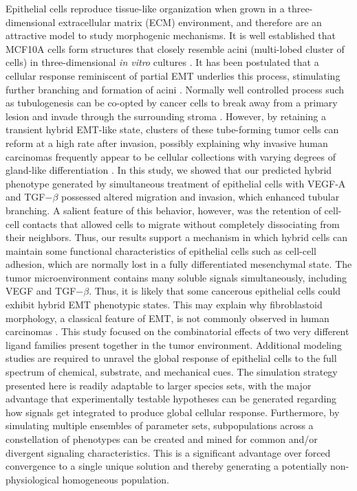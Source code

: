 \documentclass[11pt,letterpaper]{article}
\begin{document}
Epithelial cells reproduce tissue-like organization when grown in a three-dimensional extracellular matrix (ECM) environment, and therefore are an attractive model to study morphogenic mechanisms.
It is well established that MCF10A cells form structures that closely resemble acini (multi-lobed cluster of cells) in three-dimensional \emph{in vitro} cultures \cite{Debnath2003}.
It has been postulated that a cellular response reminiscent of partial EMT underlies this process, stimulating further branching and formation of acini \cite{Pearson:2007qq}.
Normally well controlled process such as tubulogenesis can be co-opted by cancer cells to break away from a primary lesion and invade through the surrounding stroma \cite{OBrien2004}.
However, by retaining a transient hybrid EMT-like state, clusters of these tube-forming tumor cells can reform at a high rate after invasion, possibly explaining why invasive human carcinomas frequently appear to be cellular collections with varying degrees of gland-like differentiation \cite{Debnath:2005qc}.
In this study, we showed that our predicted hybrid phenotype generated by simultaneous treatment of epithelial cells with VEGF-A and TGF$-\beta$ possessed altered migration and invasion, which enhanced tubular branching.
A salient feature of this behavior, however, was the retention of cell-cell contacts that allowed cells to migrate without completely dissociating from their neighbors.
Thus, our results support a mechanism in which hybrid cells can maintain some functional characteristics of epithelial cells such as cell-cell adhesion, which are normally lost in a fully differentiated mesenchymal state. The tumor microenvironment contains many soluble signals simultaneously, including VEGF and TGF$-\beta$.
Thus, it is likely that some cancerous epithelial cells could exhibit hybrid EMT phenotypic states.
This may explain why fibroblastoid morphology, a classical feature of EMT, is not commonly observed in human carcinomas \cite{Debnath:2005qc}.
This study focused on the combinatorial effects of two very different ligand families present together in the tumor environment.
Additional modeling studies are required to unravel the global response of epithelial cells to the full spectrum of chemical, substrate, and mechanical cues.
The simulation strategy presented here is readily adaptable to larger species sets, with the major advantage that experimentally testable hypotheses can be generated regarding how signals get integrated to produce global cellular response. Furthermore, by simulating multiple ensembles of parameter sets, subpopulations across a constellation of phenotypes can be created and mined for common and/or divergent signaling characteristics.
This is a significant advantage over forced convergence to a single unique solution and thereby generating a potentially non-physiological homogeneous population.
\end{document}
